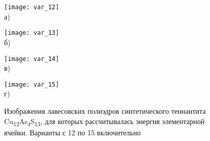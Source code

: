\begin{figure}[p!]
  \begin{minipage}[ht]{0.45\linewidth}\centering
    \texttt{[image: var\_12]} \\ а)
  \end{minipage}
\hfill
 \begin{minipage}[ht]{0.45\linewidth}\centering
    \texttt{[image: var\_13]} \\ б)
  \end{minipage}
\vfill
  \begin{minipage}[ht]{0.45\linewidth}\centering
    \texttt{[image: var\_14]} \\ в)
  \end{minipage}
	\hfill
 \begin{minipage}[ht]{0.45\linewidth}\centering
    \texttt{[image: var\_15]} \\ г)
  \end{minipage}
\vfill

  \begin{minipage}[ht]{0.45\linewidth}\centering

  \end{minipage}
						\hfill
 \begin{minipage}[ht]{0.45\linewidth}\centering

  \end{minipage}
      \caption[Изображения лавесовских полиэдров синтетического теннантита Cu\textsubscript{12}As\textsubscript{4}S\textsubscript{13}, для которых рассчитывалась энергия элементарной ячейки. Варианты с 12 по 15 включительно]{Изображения лавесовских полиэдров синтетического теннантита Cu\textsubscript{12}As\textsubscript{4}S\textsubscript{13}, для которых рассчитывалась энергия элементарной ячейки. Варианты с 12 по 15 включительно}
    \label{img:laves3}
\end{figure}


